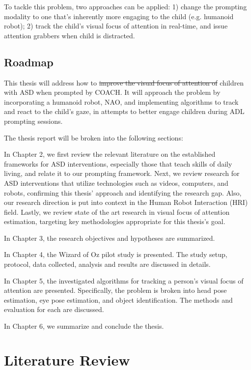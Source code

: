 \documentclass{ut-thesis}
\providecommand{\DIFaddtex}[1]{{\protect\color{blue}\uwave{#1}}} %
\providecommand{\DIFdeltex}[1]{{\protect\color{red}\sout{#1}}}                      %
\providecommand{\DIFaddbegin}{} %
\providecommand{\DIFaddend}{} %
\providecommand{\DIFdelbegin}{} %
\providecommand{\DIFdelend}{} %
\providecommand{\DIFadd}[1]{\texorpdfstring{\DIFaddtex{#1}}{#1}} %
\providecommand{\DIFdel}[1]{\texorpdfstring{\DIFdeltex{#1}}{}} %
\begin{document}
To tackle this problem, two approaches can be applied: 1) change the prompting modality to one that's inherently more engaging to the child (e.g. humanoid robot); 2) track the child's visual focus of attention in real-time, and issue attention grabbers when child is distracted.

\section{Roadmap}

This thesis will address how to \DIFdelbegin \DIFdel{improve the visual focus of attention of }\DIFdelend \DIFaddbegin \DIFadd{better engage }\DIFaddend children with ASD when prompted by COACH.  It will approach the problem by incorporating a humanoid robot, NAO, and implementing algorithms to track and react to the child's gaze, in attempts to better engage children during ADL prompting sessions.


The thesis report will be broken into the following sections:


In Chapter 2, we first review the relevant literature on the established frameworks for ASD interventions, especially those that teach skills of daily living, and relate it to our prompting framework.  Next, we review research for ASD interventions that utilize technologies such as videos, computers, and robots, confirming this thesis' approach and identifying the research gap.  Also, our research direction is put into context in the Human Robot Interaction (HRI) field.  Lastly, we review state of the art research in visual focus of attention estimation, targeting key methodologies appropriate for this thesis's goal.


In Chapter 3, the research objectives and hypotheses are summarized.

In Chapter 4, the Wizard of Oz pilot study is presented.  The study setup, protocol, data collected, analysis and results are discussed in details.

In Chapter 5, the investigated algorithms for tracking a person's visual focus of attention are presented.  Specifically, the problem is broken into head pose estimation, eye pose estimation, and object identification.  The methods and evaluation for each are discussed.

In Chapter 6, we summarize and conclude the thesis.




\chapter{Literature Review}
\end{document}
